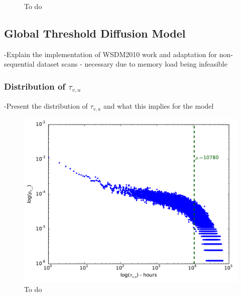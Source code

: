 \documentclass[journal,10pt,draftclsnofoot,onecolumn]{IEEEtran}
\begin{document}
\begin{figure}[ht!]
  \begin{center}
  \end{center}    
  \caption{To do}
  \label{fig:exposure_dists}
\end{figure}



\subsection{Global Threshold Diffusion Model}
-Explain the implementation of WSDM2010 work and adaptation for non-sequential dataset scans - necessary due to memory load being infeasible

\subsubsection{Distribution of $\tau_{v,u}$}
-Present the distribution of $\tau_{v,u}$ and what this implies for the model

\begin{figure}[ht!]
  \begin{center}
\includegraphics[width=0.49\columnwidth]{plots/taus_dist_full_log.pdf}
  \end{center}    
  \caption{To do}
  \label{fig:taus_dist}
\end{figure}
\end{document}
